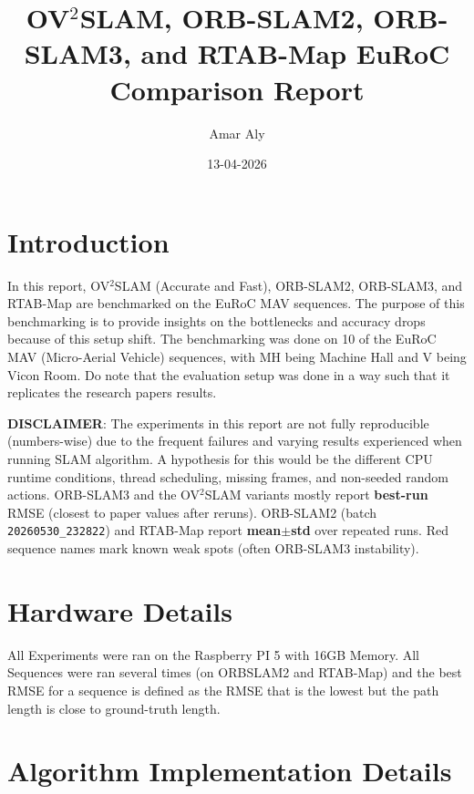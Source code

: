 \documentclass[11pt]{article}
\title{OV$^{2}$SLAM, ORB-SLAM2, ORB-SLAM3, and RTAB-Map EuRoC Comparison Report}
\author{Amar Aly}
\date{13-04-2026}
\begin{document}
\maketitle


\tableofcontents

\section{Introduction}

In this report, OV$^{2}$SLAM (Accurate and Fast), ORB-SLAM2, ORB-SLAM3, and RTAB-Map are benchmarked on the EuRoC MAV sequences. The purpose of this benchmarking is to provide insights on the bottlenecks and accuracy drops because of this setup shift. The benchmarking was done on 10 of the EuRoC MAV (Micro-Aerial Vehicle) sequences, with MH being Machine Hall and V being Vicon Room. Do note that the evaluation setup was done in a way such that it replicates the research papers results.

\textbf{DISCLAIMER}: The experiments in this report are not fully reproducible (numbers-wise) due to the frequent failures and varying results experienced when running SLAM algorithm. A hypothesis for this would be the different CPU runtime conditions, thread scheduling, missing frames, and non-seeded random actions. ORB-SLAM3 and the OV$^{2}$SLAM variants mostly report \textbf{best-run} RMSE (closest to paper values after reruns). ORB-SLAM2 (batch \texttt{20260530\_232822}) and RTAB-Map report \textbf{mean$\pm$std} over repeated runs. Red sequence names mark known weak spots (often ORB-SLAM3 instability).

\section{Hardware Details}
All Experiments were ran on the Raspberry PI 5 with 16GB Memory. All Sequences were ran several times (on ORBSLAM2 and RTAB-Map) and the best RMSE for a sequence is defined as the RMSE that is the lowest but the path length is close to ground-truth length. 

\section{Algorithm Implementation Details}
\end{document}
